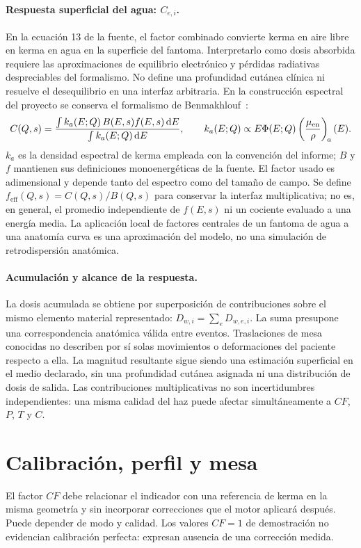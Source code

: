 \paragraph{Respuesta superficial del agua: $C_{e,i}$.}
En la ecuación 13 de la fuente, el factor combinado convierte kerma en aire libre en kerma en agua en la superficie del fantoma. Interpretarlo como dosis absorbida requiere las aproximaciones de equilibrio electrónico y pérdidas radiativas despreciables del formalismo. No define una profundidad cutánea clínica ni resuelve el desequilibrio en una interfaz arbitraria. En la construcción espectral del proyecto se conserva el formalismo de Benmakhlouf~\citep{benreport}:
\begin{equation}
C(Q,s)=\frac{\int k_a(E;Q)\,B(E,s)f(E,s)\,\mathrm dE}
{\int k_a(E;Q)\,\mathrm dE},
\qquad k_a(E;Q)\propto E\Phi(E;Q)\left(\frac{\mu_{\mathrm{en}}}{\rho}\right)_{\!a}(E).
\end{equation}
$k_a$ es la densidad espectral de kerma empleada con la convención del informe; $B$ y $f$ mantienen sus definiciones monoenergéticas de la fuente. El factor usado es adimensional y depende tanto del espectro como del tamaño de campo. Se define $f_{\mathrm{eff}}(Q,s)=C(Q,s)/B(Q,s)$ para conservar la interfaz multiplicativa; no es, en general, el promedio independiente de $f(E,s)$ ni un cociente evaluado a una energía media. La aplicación local de factores centrales de un fantoma de agua a una anatomía curva es una aproximación del modelo, no una simulación de retrodispersión anatómica.

\paragraph{Acumulación y alcance de la respuesta.}
La dosis acumulada se obtiene por superposición de contribuciones sobre el mismo elemento material representado: $D_{w,i}=\sum_eD_{w,e,i}$. La suma presupone una correspondencia anatómica válida entre eventos. Traslaciones de mesa conocidas no describen por sí solas movimientos o deformaciones del paciente respecto a ella. La magnitud resultante sigue siendo una estimación superficial en el medio declarado, sin una profundidad cutánea asignada ni una distribución de dosis de salida. Las contribuciones multiplicativas no son incertidumbres independientes: una misma calidad del haz puede afectar simultáneamente a $CF$, $P$, $T$ y $C$.

\section{Calibración, perfil y mesa}
El factor $CF$ debe relacionar el indicador con una referencia de kerma en la misma geometría y sin incorporar correcciones que el motor aplicará después. Puede depender de modo y calidad. Los valores $CF=1$ de demostración no evidencian calibración perfecta: expresan ausencia de una corrección medida.

